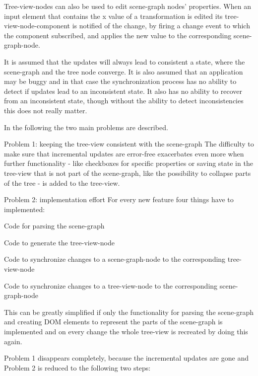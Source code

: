 Tree-view-nodes can also be used to edit scene-graph nodes' properties. When an
input element that contains the x value of a transformation is edited its
tree-view-node-component is notified of the change, by firing a change event to
which the component subscribed, and applies the new value to the corresponding
scene-graph-node.

It is assumed that the updates will always lead to consistent a state, where the
scene-graph and the tree node converge. It is also assumed that an application
may be buggy and in that case the synchronization process has no ability to
detect if updates lead to an inconsistent state. It also has no ability to
recover from an inconsistent state, though without the ability to detect
inconsistencies this does not really matter.

In the following the two main problems are described.

\begin{description*}
  \item[Problem 1: keeping the tree-view consistent with the scene-graph]
    The difficulty to make sure that incremental updates are error-free
    exacerbates even more when further functionality - like checkboxes for
    specific properties or saving state in the tree-view that is not part of
    the scene-graph, like the possibility to collapse parts of the tree - is
    added to the tree-view.
  \item[Problem 2: implementation effort]
    For every new feature four things have to implemented:
    \begin{enumerate*}
      \item Code for parsing the scene-graph
      \item Code to generate the tree-view-node
      \item Code to synchronize changes to a scene-graph-node to the corresponding tree-view-node
      \item Code to synchronize changes to a tree-view-node to the corresponding scene-graph-node
    \end{enumerate*}
\end{description*}

This can be greatly simplified if only the functionality for parsing the
scene-graph and creating \gls{DOM} elements to represent the parts of the scene-graph
is implemented and on every change the whole tree-view is recreated by doing
this again.

Problem 1 disappears completely, because the incremental updates are gone and
Problem 2 is reduced to the following two steps:

